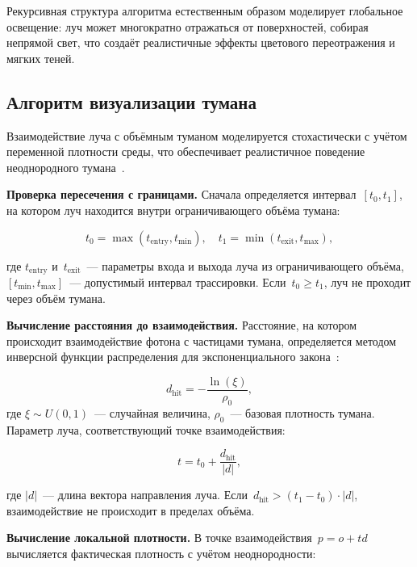 Рекурсивная структура алгоритма естественным образом моделирует глобальное освещение:
луч может многократно отражаться от поверхностей, собирая непрямой свет, что создаёт реалистичные эффекты цветового переотражения и мягких теней.

\subsection{Алгоритм визуализации тумана}

Взаимодействие луча с объёмным туманом моделируется стохастически с учётом переменной плотности среды, что обеспечивает реалистичное поведение неоднородного тумана~\cite{volumetric-fog}.

\textbf{Проверка пересечения с границами.} Сначала определяется интервал~$[t_0, t_1]$, на котором луч находится внутри ограничивающего объёма тумана:

\begin{equation}
t_0 = \max(t_{\text{entry}}, t_{\min}), \quad t_1 = \min(t_{\text{exit}}, t_{\max}),
\end{equation}

\noindent где $t_{\text{entry}}$ и~$t_{\text{exit}}$~--- параметры входа и выхода луча из ограничивающего объёма, $[t_{\min}, t_{\max}]$~--- допустимый интервал трассировки. Если~$t_0 \geq t_1$, луч не проходит через объём тумана.

\textbf{Вычисление расстояния до взаимодействия.} Расстояние, на котором происходит взаимодействие фотона с частицами тумана, определяется методом инверсной функции распределения для экспоненциального закона~\cite{pbr-book}:

\begin{equation}
d_{\text{hit}} = -\frac{\ln(\xi)}{\rho_0},
\end{equation}
\noindent где $\xi \sim U(0, 1)$~--- случайная величина, $\rho_0$~--- базовая плотность тумана. Параметр луча, соответствующий точке взаимодействия:

\begin{equation}
t = t_0 + \frac{d_{\text{hit}}}{|d|},
\end{equation}

\noindent где $|d|$~--- длина вектора направления луча. Если~$d_{\text{hit}} > (t_1 - t_0) \cdot |d|$, взаимодействие не происходит в пределах объёма.

\textbf{Вычисление локальной плотности.} В точке взаимодействия~$p = o + td$ вычисляется фактическая плотность с учётом неоднородности:

